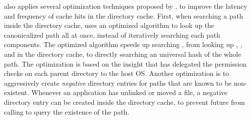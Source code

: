 \thelibos{} also applies several optimization techniques
proposed by \citet{tsai15dcache}, to improve the latency and frequency of cache hits
in the directory cache.
First, when searching a path inside the directory cache,
\thelibos{} uses an optimized algorithm to look up the canonicalized path all at once,
instead of iteratively searching each path components.
The optimized algorithm speeds up searching ,
from looking up
, , and  in the directory cache,
to directly searching
an universal hash of the whole path.
The optimization is based on the insight that \thelibos{}
has delegated the permission checks on each parent directory to the host OS.
Another optimization
is to aggressively create {\em negative} directory entries
for paths that are known to be non-existent.
Whenever an application has unlinked or moved a file,
a negative directory entry can be created inside the directory cache, to prevent future \linuxapis{} from calling  to query the existence of the path.





